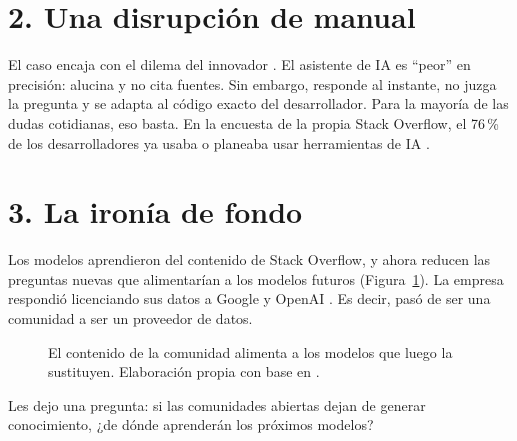 \documentclass[11pt,letterpaper]{article}
\begin{document}
\section*{2. Una disrupción de manual}

El caso encaja con el dilema del innovador \parencite{christensen1997}. El
asistente de IA es \enquote{peor} en precisión: alucina y no cita fuentes. Sin
embargo, responde al instante, no juzga la pregunta y se adapta al código
exacto del desarrollador. Para la mayoría de las dudas cotidianas, eso basta. En
la encuesta de la propia Stack Overflow, el 76\,\% de los desarrolladores ya
usaba o planeaba usar herramientas de IA \parencite{stackoverflow2024encuesta}.

\section*{3. La ironía de fondo}

Los modelos aprendieron del contenido de Stack Overflow, y ahora reducen las
preguntas nuevas que alimentarían a los modelos futuros
(Figura~\ref{fig:circulo}). La empresa respondió licenciando sus datos a Google
y OpenAI \parencite{stackoverflow2024google,stackoverflow2024openai}. Es decir, pasó de ser una
comunidad a ser un proveedor de datos.

\begin{figure}[H]
\centering
{}
\caption{El contenido de la comunidad alimenta a los modelos que luego la
sustituyen. Elaboración propia con base en \Textcite{delriochanona2024}.}
\label{fig:circulo}
\end{figure}

Les dejo una pregunta: si las comunidades abiertas dejan de generar
conocimiento, ¿de dónde aprenderán los próximos modelos?

\printbibliography[title={Referencias}]
\end{document}

